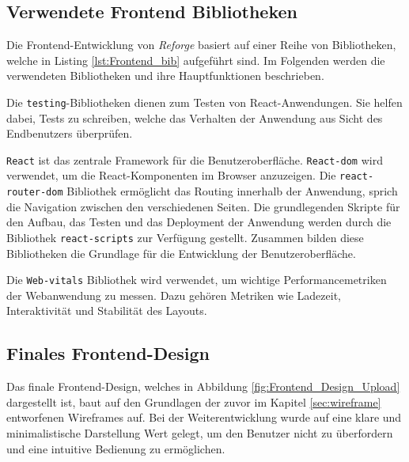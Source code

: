 \subsection{Verwendete Frontend Bibliotheken}
Die Frontend-Entwicklung von \textit{Reforge} basiert auf einer Reihe von Bibliotheken, welche in Listing \ref{lst:Frontend_bib} aufgeführt sind. Im Folgenden werden die verwendeten Bibliotheken und ihre Hauptfunktionen beschrieben.


Die \texttt{testing}-Bibliotheken dienen zum Testen von React-Anwendungen. Sie helfen dabei, Tests zu schreiben, welche das Verhalten der Anwendung aus Sicht des Endbenutzers überprüfen.

\texttt{React} ist das zentrale Framework für die Benutzeroberfläche. \texttt{React-dom} wird verwendet, um die React-Komponenten im Browser anzuzeigen. Die \texttt{react-router-dom} Bibliothek ermöglicht das Routing innerhalb der Anwendung, sprich die Navigation zwischen den verschiedenen Seiten. Die grundlegenden Skripte für den Aufbau, das Testen und das Deployment der Anwendung werden durch die Bibliothek \texttt{react-scripts} zur Verfügung gestellt. Zusammen bilden diese Bibliotheken die Grundlage für die Entwicklung der Benutzeroberfläche.

Die \texttt{Web-vitals} Bibliothek wird verwendet, um wichtige Performancemetriken der Webanwendung zu messen. Dazu gehören Metriken wie Ladezeit, Interaktivität und Stabilität des Layouts.

\subsection{Finales Frontend-Design}

Das finale Frontend-Design, welches in Abbildung \ref{fig:Frontend_Design_Upload} dargestellt ist, baut auf den Grundlagen der zuvor im Kapitel \ref{sec:wireframe} entworfenen Wireframes auf. Bei der Weiterentwicklung wurde auf eine klare und minimalistische Darstellung Wert gelegt, um den Benutzer nicht zu überfordern und eine intuitive Bedienung zu ermöglichen.  

